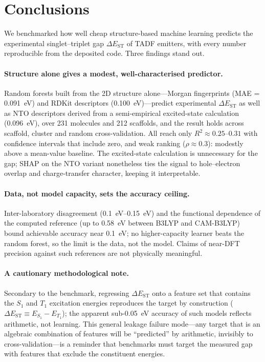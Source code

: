 
\section{Conclusions}\label{sec:conclusions}

We benchmarked how well cheap structure-based machine learning predicts the
experimental singlet--triplet gap $\Delta E_\text{ST}$ of TADF emitters, with every
number reproducible from the deposited code. Three findings stand out.

\paragraph{Structure alone gives a modest, well-characterised predictor.}
Random forests built from the 2D structure alone---Morgan fingerprints
(MAE = \qty{0.091}{\electronvolt}) and RDKit descriptors
(\qty{0.100}{\electronvolt})---predict experimental $\Delta E_\text{ST}$ as well
as NTO descriptors derived from a semi-empirical excited-state calculation
(\qty{0.096}{\electronvolt}), over \num{231} molecules and \num{212} scaffolds, and
the result holds across scaffold, cluster and random cross-validation. All reach only
$R^2 \approx 0.25$--$0.31$ with confidence intervals that include zero, and weak
ranking ($\rho \approx 0.3$): modestly above a mean-value baseline. The excited-state
calculation is unnecessary for the gap; SHAP on the NTO variant nonetheless ties the
signal to hole--electron overlap and charge-transfer character, keeping it interpretable.

\paragraph{Data, not model capacity, sets the accuracy ceiling.}
Inter-laboratory disagreement (\qtyrange{0.1}{0.15}{\electronvolt}) and the
functional dependence of the computed reference (up to \qty{0.58}{\electronvolt}
between B3LYP and CAM-B3LYP) bound achievable accuracy near
\qty{0.1}{\electronvolt}; no higher-capacity learner beats the random forest, so the
limit is the data, not the model. Claims of near-DFT precision against such references
are not physically meaningful.

\paragraph{A cautionary methodological note.}
Secondary to the benchmark, regressing $\Delta E_\text{ST}$ onto a feature set that
contains the $S_1$ and $T_1$ excitation energies reproduces the target by construction
($\Delta E_\text{ST}\equiv E_{S_1}-E_{T_1}$); the apparent sub-\num{0.05}~eV accuracy of
such models reflects arithmetic, not learning. This general leakage failure mode---any
target that is an algebraic combination of features will be ``predicted'' by
arithmetic, invisibly to cross-validation---is a reminder that benchmarks must target
the measured gap with features that exclude the constituent energies.

